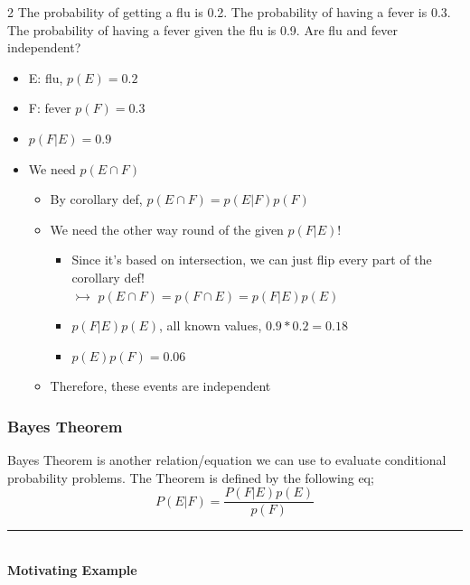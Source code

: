 \documentclass[12pt, letterpaper]{article}
\newcommand{\cul}[1]{%
		\uline{\phantom{#1}}%
		\llap{\contour{white}{#1}}%
	}
\newcommand{\exheader}[1][ex]{{\tiny{#1}\normalsize}}
\newcommand{\horizline}[0]{\noindent\rule{\textwidth}{1pt}\\}
\begin{document}
\exheader[2] The probability of getting a flu is 0.2. The probability of having a fever is 0.3. The probability of having a fever given the flu is 0.9. Are flu and fever independent?
\begin{itemize}[leftmargin=*, label={}]
	\item E: flu, \quad $p(E) = 0.2$
	\item F: fever \quad $p(F) = 0.3$
	\item $p(F|E) = 0.9$
	\item We need $p(E \cap F)$
	\begin{itemize}
		\item By corollary def, $p(E \cap F) = p(E|F)p(F)$
		\item We need the other way round of the given $p(F|E)$!
		\begin{itemize}
			\item Since it's based on intersection, we can just flip every part of the corollary def! \\ $\rightarrowtail$ \quad $p(E\cap F) = p(F \cap E) = p(F|E) p(E)$
			\item $p(F|E) p(E)$, all known values, $0.9 * 0.2 = 0.18$
			\item $p(E)p(F) = 0.06$
		\end{itemize}
	\item Therefore, these events are \cul{not} independent
	\end{itemize}
\end{itemize}


\pagebreak

\subsubsection{Bayes Theorem}

Bayes Theorem is another relation/equation we can use to evaluate conditional probability problems. The Theorem is defined by the following eq; \[P(E|F) = \frac{P(F|E)p(E)}{p(F)}\]

\horizline

\textbf{Motivating Example} \\ 
\end{document}
